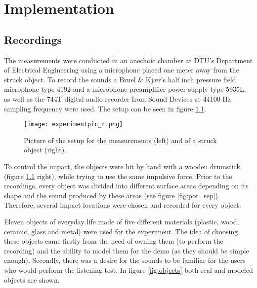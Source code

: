 \chapter{Implementation}\label{ch:implementation}


%

\section{Recordings}\label{sec:recordings}

The measurements were conducted in an anechoic chamber at \gls{DTU}'s Department of Electrical Engineering using a microphone placed one meter away from the struck object. To record the sounds a Bruel \& Kjær's half inch pressure field microphone type 4192 and a microphone preamplifier power supply type 5935L, as well as the 744T digital audio recorder from Sound Devices at 44100 Hz sampling frequency were used. The setup can be seen in figure \ref{fig:experiment}.

\begin{figure}[H]
  \centering
    \texttt{[image: experimentpic\_r.png]}
      \caption{Picture of the setup for the measurements (left) and of a struck object (right).}\label{fig:experiment}
\end{figure}

To control the impact, the objects were hit by hand with a wooden drumstick (figure \ref{fig:experiment} right), while trying to use the same impulsive force. Prior to the recordings, every object was divided into different surface areas depending on its shape and the sound produced by these areas (see figure \ref{fig:pot_sep}). Therefore, several impact locations were chosen and recorded for every object.

Eleven objects of everyday life made of five different materials (plastic, wood, ceramic, glass and metal) were used for the experiment. The idea of choosing these objects came firstly from the need of owning them (to perform the recording) and the ability to model them for the demo (as they should be simple enough). Secondly, there was a desire for the sounds to be familiar for the users who would perform the listening test. In figure \ref{fig:objects} both real and modeled objects are shown. 

